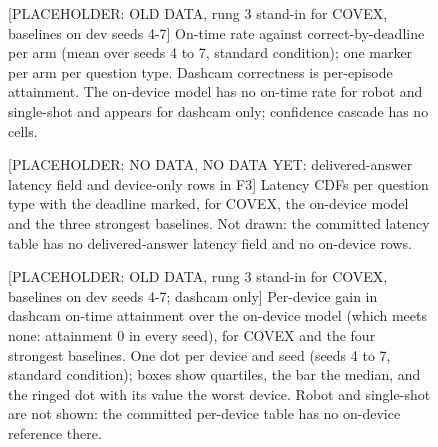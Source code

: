\documentclass[sigconf]{acmart}
\begin{document}
\clearpage
\begin{figure}[t]
\centering
{\selectfont
}
\caption{[PLACEHOLDER: OLD DATA, rung 3 stand-in for COVEX, baselines on dev seeds 4-7] On-time rate against correct-by-deadline per arm (mean over seeds 4 to 7, standard condition); one marker per arm per question type. Dashcam correctness is per-episode attainment. The on-device model has no on-time rate for robot and single-shot and appears for dashcam only; confidence cascade has no cells.}
\label{fig:F2_ontime_vs_correct}
\end{figure}
\clearpage
\begin{figure}[t]
\centering
{\selectfont
}
\caption{[PLACEHOLDER: NO DATA, NO DATA YET: delivered-answer latency field and device-only rows in F3] Latency CDFs per question type with the deadline marked, for COVEX, the on-device model and the three strongest baselines. Not drawn: the committed latency table has no delivered-answer latency field and no on-device rows.}
\label{fig:F3_latency_cdf}
\end{figure}
\clearpage
\begin{figure}[t]
\centering
{\selectfont
}
\caption{[PLACEHOLDER: OLD DATA, rung 3 stand-in for COVEX, baselines on dev seeds 4-7; dashcam only] Per-device gain in dashcam on-time attainment over the on-device model (which meets none: attainment 0 in every seed), for COVEX and the four strongest baselines. One dot per device and seed (seeds 4 to 7, standard condition); boxes show quartiles, the bar the median, and the ringed dot with its value the worst device. Robot and single-shot are not shown: the committed per-device table has no on-device reference there.}
\label{fig:F4_per_device}
\end{figure}
\clearpage


\end{document}
